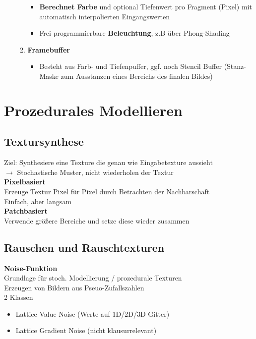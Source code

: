 \documentclass[10pt,a4paper]{article}
\begin{document}
\begin{itemize}
\begin{enumerate}
\begin{itemize}
				\item \textbf{Berechnet Farbe} und optional Tiefenwert pro Fragment (Pixel) mit automatisch interpolierten Eingangswerten
				\item Frei programmierbare \textbf{Beleuchtung}, z.B über Phong-Shading
			\end{itemize}
			\item \textbf{Framebuffer}
			\begin{itemize}
				\item Besteht aus Farb- und Tiefenpuffer, ggf. noch Stencil Buffer (Stanz-Maske zum Ausstanzen eines Bereichs des finalen Bildes)
			\end{itemize}
		\end{enumerate}
        \end{itemize}

        \newpage
        \section{Prozedurales Modellieren}
        
        \subsection{Textursynthese}
        Ziel: Synthesiere eine Texture die genau wie Eingabetexture aussieht\\
        \(\rightarrow\) Stochastische Muster, nicht wiederholen der Textur\\

        \textbf{Pixelbasiert}\\
        Erzeuge Textur Pixel für Pixel durch Betrachten der Nachbarschaft\\
        Einfach, aber langsam\\

        \textbf{Patchbasiert}\\
        Verwende größere Bereiche und setze diese wieder zusammen

        \subsection{Rauschen und Rauschtexturen}
        \textbf{Noise-Funktion}\\
        Grundlage für stoch. Modellierung / prozedurale Texturen\\
        Erzeugen von Bildern aus Pseuo-Zufallszahlen\\
        2 Klassen
        \begin{itemize}
          \item Lattice Value Noise (Werte auf 1D/2D/3D Gitter)
          \item Lattice Gradient Noise (nicht klausurrelevant)
        \end{itemize}
\end{document}
